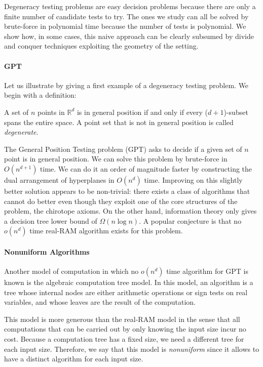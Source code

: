 Degeneracy testing problems are easy decision problems because there are only
a finite number of candidate tests to try. The ones we study can all be solved
by brute-force in polynomial time because the number of tests is polynomial.
We show how, in some cases, this naive approach can be clearly subsumed by
divide and conquer techniques exploiting the geometry of the setting.

\paragraph{GPT}
Let us illustrate by giving a first example of a degeneracy testing problem. We
begin with a definition:

\begin{definition}
A set of \(n\) points in \(\mathbb{R}^d\)
is in general position if and only if every (\(d+1\))-subset spans the entire
space. A point set that is not in general position is called \emph{degenerate}.
\end{definition}

The General Position Testing problem (GPT) asks to decide if a given set of
\(n\) point is in general position. We can solve this problem by brute-force in
\(O(n^{d+1})\) time.
We can do it an order of magnitude faster
by constructing the dual arrangement of hyperplanes in
\(O(n^d)\) time.
Improving on this slightly better solution appears to be non-trivial: there
exists a class of algorithms that cannot do better even though they
exploit one of the core structures of the problem, the chirotope axioms.
On the other hand, information theory only gives a decision tree
lower bound of \(\Omega(n \log n)\).
A popular conjecture is that no \(o(n^d)\) time real-RAM
algorithm exists for this problem.

\paragraph{Nonuniform Algorithms}
Another model of computation in which no \(o(n^d)\) time algorithm for GPT
is known is the algebraic computation tree model. In this model,
an algorithm is a tree whose internal nodes are either arithmetic operations or
sign tests on real variables, and whose leaves are the result of the computation.

This model is
more generous than the real-RAM model in the sense that all computations that
can be carried out by only knowing the input size incur no cost.
%
Because a computation tree has a fixed size, we need a different tree for each
input size.
%
Therefore,
we say that this model is \emph{nonuniform} since it allows to have a
distinct algorithm for each input size.

